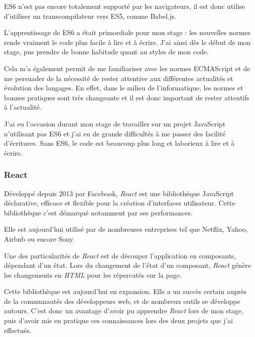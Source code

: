 \documentclass[12pt,a4paper]{article}
\begin{document}
  ES6 n'est pas encore totalement supporté par les navigateurs, il est
  donc utilise d'utiliser un transcompilateur vers ES5, comme Babel.js.

  \bigskip

  L'apprentissage de ES6 a était primordiale pour mon stage : les
  nouvelles normes rende vraiment le code plus facile à lire et à écrire.
  J'ai ainsi dès le début de mon stage, pus prendre de bonne habitude
  quant au styles de mon code.

  \bigskip

  Cela m'a également permit de me familiariser avec les normes ECMAScript
  et de me persuader de la nécessité de rester attentive aux différentes
  actualités et évolution des langages. En effet, dans le milieu de
  l'informatique, les normes et bonnes pratiques sont très changeante et
  il est donc important de rester attentifs à l'actualité.

  \bigskip

  J'ai eu l'occasion durant mon stage de travailler sur un projet
  JavaScript n'utilisant pas ES6 et j'ai eu de grande difficultés à me
  passer des facilité d'écritures. Sans ES6, le code est beaucoup plus
  long et laborieux à lire et à écrire.

  \bigskip

  \subsubsection{React}\label{react}

  \bigskip

  Développé depuis 2013 par Facebook, \emph{React} est une bibliothèque
  JavaScript déclarative, efficace et flexible pour la création
  d'interfaces utilisateur. Cette bibliothèque c'est démarqué notamment
  par ses performances.

  \bigskip

  Elle est aujourd'hui utilisé par de nombreuses entreprises tel que
  Netflix, Yahoo, Airbnb ou encore Sony.

  \bigskip

  Une des particularités de \emph{React} est de découper l'application en
  composants, dépendant d'un état. Lors du changement de l'état d'un
  composant, \emph{React} génère les changements en \emph{HTML} pour les
  répercutés sur la page.

  \bigskip

  Cette bibliothèque est aujourd'hui en expansion. Elle a un succès
  certain auprès de la communautés des développeurs web, et de nombreux
  outils se développe autours. C'est donc un avantage d'avoir pu apprendre
  \emph{React} lors de mon stage, puis d'avoir mis en pratique ces
  connaissances lors des deux projets que j'ai effectués.
\end{document}
